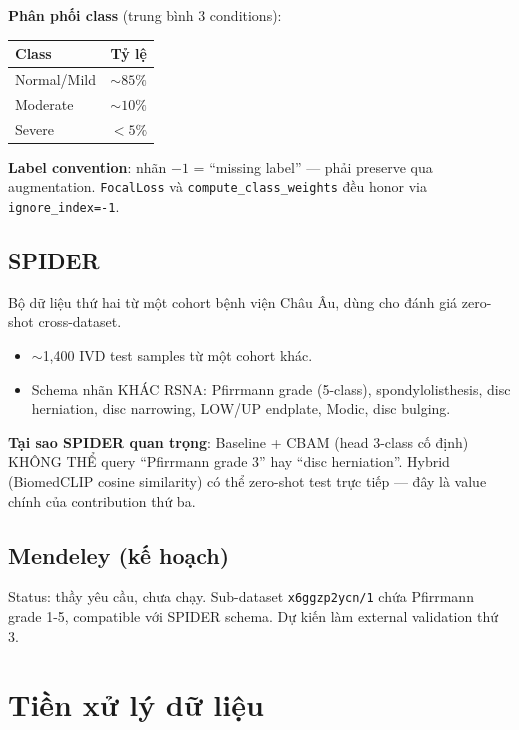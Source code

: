 \documentclass[11pt,a4paper]{article}
\begin{document}
\noindent\textbf{Phân phối class} (trung bình 3 conditions):

\begin{center}
\begin{tabular}{@{}lc@{}}
\toprule
Class & Tỷ lệ \\
\midrule
Normal/Mild & $\sim 85\%$ \\
Moderate    & $\sim 10\%$ \\
Severe      & $<5\%$ \\
\bottomrule
\end{tabular}
\end{center}

\noindent\textbf{Label convention}: nhãn $-1$ = ``missing label'' ---
phải preserve qua augmentation. \verb|FocalLoss| và
\verb|compute_class_weights| đều honor via \verb|ignore_index=-1|.

\subsection{SPIDER}

\noindent Bộ dữ liệu thứ hai từ một cohort bệnh viện Châu Âu, dùng cho
đánh giá zero-shot cross-dataset.

\begin{itemize}[leftmargin=*]
\item $\sim$1,400 IVD test samples từ một cohort khác.
\item Schema nhãn KHÁC RSNA: Pfirrmann grade (5-class), spondylolisthesis,
disc herniation, disc narrowing, LOW/UP endplate, Modic, disc bulging.
\end{itemize}

\noindent\textbf{Tại sao SPIDER quan trọng}: Baseline + CBAM (head 3-class
cố định) KHÔNG THỂ query ``Pfirrmann grade 3'' hay ``disc herniation''.
Hybrid (BiomedCLIP cosine similarity) có thể zero-shot test trực tiếp
--- đây là value chính của contribution thứ ba.

\subsection{Mendeley (kế hoạch)}

\noindent Status: thầy yêu cầu, chưa chạy. Sub-dataset \texttt{x6ggzp2ycn/1}
chứa Pfirrmann grade 1-5, compatible với SPIDER schema. Dự kiến làm
external validation thứ 3.

\section{Tiền xử lý dữ liệu}
\end{document}
